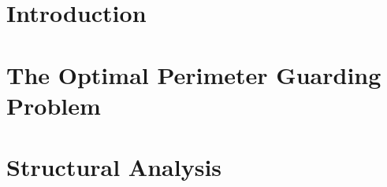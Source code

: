 
\newtheorem{theorem}{Theorem}
\newtheorem{definition}[theorem]{Definition}
\newtheorem{proposition}[theorem]{Proposition}
\newtheorem{corollary}[theorem]{Corollary}
\newtheorem{observation}[theorem]{Observation}
\newtheorem{axiom}[theorem]{Axiom}
\newtheorem{lemma}[theorem]{Lemma}
\newtheorem{problem}{Problem}
\newtheorem{prob}[theorem]{Problem}
\newtheorem{conjecture}[theorem]{Conjecture}
\newtheorem{obj}[theorem]{Objective}
\newtheorem{prop}[theorem]{Property}
\newtheorem{schedule}[theorem]{Schedule}

\def\R{\mathcal R}
\def\C{\mathcal C}
\def\S{\mathcal S}
\def\P{\mathcal P}
\def\G{\mathcal G}
\def\W{\mathcal W}
\def\opg{{\sc {OPG}}\xspace}

\newenvironment{remark}{\noindent\textbf{Remark.} }{\hfill$\triangle$}




\section{Introduction}\label{section:introduction}


\section{The Optimal Perimeter Guarding Problem}\label{section:problem}


\section{Structural Analysis}\label{section:analysis}


